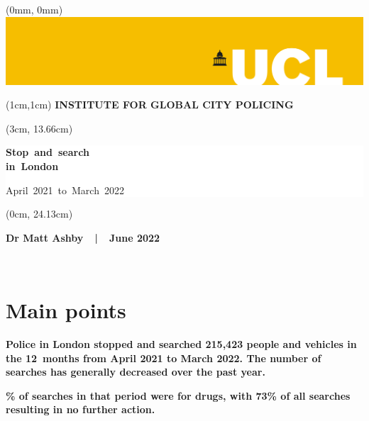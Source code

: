 \documentclass[
  a4paper,
  twoside, 11pt]{article}
\begin{document}
\begin{textblock*}{21cm}(0mm, 0mm)
\includegraphics[width=21cm]{../ucl-banner-port-yellow-rgb-lg.png}
\end{textblock*}

\begin{textblock*}{21cm}(1cm,1cm)
\textbf{\sffamily INSTITUTE FOR GLOBAL CITY POLICING}
\end{textblock*}

\begin{textblock*}{18cm}(3cm, 13.66cm)
\raggedright \sffamily
\begin{singlespace}
\colorbox{white}{\hspace{1cm}\parbox[c][5.9cm]{16cm}{
{\fontsize{40}{32}\selectfont \bfseries \mbox{Stop and search}\\\mbox{in London}
\vspace{6pt}}

{\fontsize{32}{26}\selectfont \mbox{April 2021 to March 2022} }

}\hspace{1cm}}
\end{singlespace}
\end{textblock*}

\begin{textblock*}{11.43cm}(0cm, 24.13cm)
\colorbox{uclyellow}{\parbox[c][2.63cm]{\textwidth}{
\centering \bfseries \sffamily \fontsize{16}{16}\selectfont 
Dr Matt Ashby\ \ |\ \ June 2022
}}
\end{textblock*}

~

\thispagestyle{empty}
\newpage

\hypertarget{main-points}{%
\section{Main points}\label{main-points}}

\textbf{\sffamily Police in London stopped and searched 215,423 people and vehicles in the 12~months from April 2021 to March 2022. The number of searches has generally decreased over the past year.}

\textbf{\% of searches in that period were for drugs, with 73\% of all searches resulting in no further action.}
\end{document}
